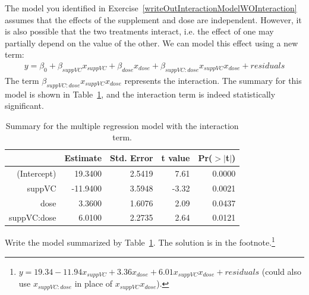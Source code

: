 The model you identified in Exercise~\ref{writeOutInteractionModelWOInteraction} assumes that the effects of the supplement and dose are independent. However, it is also possible that the two treatments interact, i.e. the effect of one may partially depend on the value of the other. We can model this  effect using a new term:
\begin{align*}
y = \beta_0 + \beta_{suppVC}x_{suppVC} + \beta_{dose}x_{dose} + \beta_{suppVC:dose}x_{suppVC}x_{dose} + residuals
\end{align*}
The term $\beta_{suppVC:dose}x_{suppVC}x_{dose}$ represents the interaction. The summary for this model is shown in Table~\ref{modelSummaryIncludingInteraction}, and the interaction term is indeed statistically significant.
\begin{table}[ht]
\centering
\begin{tabular}{rrrrr}
  \hline
 & Estimate & Std. Error & t value & Pr($>$$|$t$|$) \\ 
  \hline
(Intercept) & 19.3400 & 2.5419 & 7.61 & 0.0000 \\ 
  suppVC & -11.9400 & 3.5948 & -3.32 & 0.0021 \\ 
  dose & 3.3600 & 1.6076 & 2.09 & 0.0437 \\ 
  suppVC:dose & 6.0100 & 2.2735 & 2.64 & 0.0121 \\ 
   \hline
\end{tabular}
\caption{Summary for the multiple regression model with the interaction term.}
\label{modelSummaryIncludingInteraction}
\end{table}

\begin{exercise} \label{identifyModelWInteraction}
Write the model summarized by Table~\ref{modelSummaryIncludingInteraction}. The solution is in the footnote.\footnote{$y = 19.34  - 11.94x_{suppVC} + 3.36 x_{dose} + 6.01 x_{suppVC}x_{dose} + residuals$ (could also use $x_{suppVC:dose}$ in place of $x_{suppVC}x_{dose}$).}
\end{exercise}

